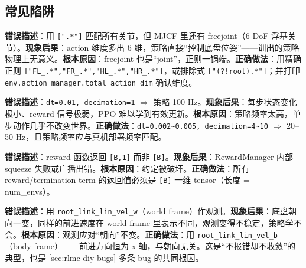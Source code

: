 \subsection{常见陷阱}
\label{sec:rlmc-diy-mjlab-pitfalls}

\begin{pitfall}
\textbf{错误描述}：用 \verb|[".*"]| 匹配所有关节，但 MJCF 里还有 freejoint（6-DoF 浮基关节）。\textbf{现象后果}：action 维度多出 6 维，策略直接“控制底盘位姿”——训出的策略物理上无意义。\textbf{根本原因}：freejoint 也是“joint”，正则一锅端。\textbf{正确做法}：用精确正则 \verb|["FL_.*","FR_.*","HL_.*","HR_.*"]|，或排除式 \verb|["(?!root).*"]|；并打印 \verb|env.action_manager.total_action_dim| 确认维度。
\end{pitfall}

\begin{pitfall}
\textbf{错误描述}：\verb|dt=0.01, decimation=1| $\Rightarrow$ 策略 100 Hz。\textbf{现象后果}：每步状态变化极小、reward 信号极弱，PPO 难以学到有效更新。\textbf{根本原因}：策略频率太高，单步动作几乎不改变世界。\textbf{正确做法}：\verb|dt=0.002~0.005, decimation=4~10| $\Rightarrow$ 20--50 Hz，且策略频率应与真机部署频率匹配。
\end{pitfall}

\begin{pitfall}
\textbf{错误描述}：reward 函数返回 \verb|[B,1]| 而非 \verb|[B]|。\textbf{现象后果}：RewardManager 内部 squeeze 失败或广播出错。\textbf{根本原因}：约定被破坏。\textbf{正确做法}：所有 reward/termination term 的返回值必须是 \verb|[B]| 一维 tensor（长度 = num\_envs）。
\end{pitfall}

\begin{pitfall}
\textbf{错误描述}：用 \verb|root_link_lin_vel_w|（world frame）作观测。\textbf{现象后果}：底盘朝向一变，同样的前进速度在 world frame 里表示不同，观测变得不稳定，策略学不会。\textbf{根本原因}：观测应对“朝向”不变。\textbf{正确做法}：用 \verb|root_link_lin_vel_b|（body frame）——前进方向恒为 x 轴，与朝向无关。这是“不报错却不收敛”的典型，也是 \cref{sec:rlmc-diy-bugs} 多条 bug 的共同根因。
\end{pitfall}

